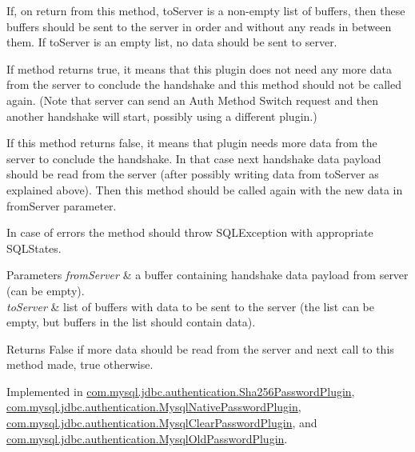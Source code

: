 If, on return from this method, to\+Server is a non-\/empty list of buffers, then these buffers should be sent to the server in order and without any reads in between them. If to\+Server is an empty list, no data should be sent to server.

If method returns true, it means that this plugin does not need any more data from the server to conclude the handshake and this method should not be called again. (Note that server can send an Auth Method Switch request and then another handshake will start, possibly using a different plugin.)

If this method returns false, it means that plugin needs more data from the server to conclude the handshake. In that case next handshake data payload should be read from the server (after possibly writing data from to\+Server as explained above). Then this method should be called again with the new data in from\+Server parameter.

In case of errors the method should throw S\+Q\+L\+Exception with appropriate S\+Q\+L\+States.


\begin{DoxyParams}{Parameters}
{\em from\+Server} & a buffer containing handshake data payload from server (can be empty). \\
\hline
{\em to\+Server} & list of buffers with data to be sent to the server (the list can be empty, but buffers in the list should contain data).\\
\hline
\end{DoxyParams}
\begin{DoxyReturn}{Returns}
False if more data should be read from the server and next call to this method made, true otherwise. 
\end{DoxyReturn}


Implemented in \mbox{\hyperlink{classcom_1_1mysql_1_1jdbc_1_1authentication_1_1_sha256_password_plugin_aa46e906714a3b8a223f0e3e15e2aaf94}{com.\+mysql.\+jdbc.\+authentication.\+Sha256\+Password\+Plugin}}, \mbox{\hyperlink{classcom_1_1mysql_1_1jdbc_1_1authentication_1_1_mysql_native_password_plugin_af91bb791cd53bd81559d8101f962618f}{com.\+mysql.\+jdbc.\+authentication.\+Mysql\+Native\+Password\+Plugin}}, \mbox{\hyperlink{classcom_1_1mysql_1_1jdbc_1_1authentication_1_1_mysql_clear_password_plugin_afe852978e8b5462d13f6f60bc8d7d6be}{com.\+mysql.\+jdbc.\+authentication.\+Mysql\+Clear\+Password\+Plugin}}, and \mbox{\hyperlink{classcom_1_1mysql_1_1jdbc_1_1authentication_1_1_mysql_old_password_plugin_a0a1725f9a449c72b77a493bce2d57bdd}{com.\+mysql.\+jdbc.\+authentication.\+Mysql\+Old\+Password\+Plugin}}.

